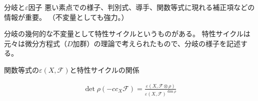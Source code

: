 \documentclass[dvipdfmx]{beamer}
\begin{document}
\begin{frame}{分岐と$\varepsilon$因子}
  悪い素点での様子、判別式、導手、関数等式に現れる補正項などの情報が重要。
  （不変量としても強力。）

  分岐の幾何的な不変量として特性サイクルというものがある。
  特性サイクルは元々は微分方程式（$D$加群）の理論で考えられたもので、分岐の様子を記述する。

  関数等式の$\varepsilon(X,\mathcal{F})$と特性サイクルの関係
  \begin{thm}
    \begin{align*}
      \det\rho(-cc_X\mathcal{F})=\frac{\varepsilon(X,\mathcal{F}\otimes\rho)}{\varepsilon(X,\mathcal{F})^{\dim\rho}}
    \end{align*}    
  \end{thm}
\end{frame}
\end{document}
